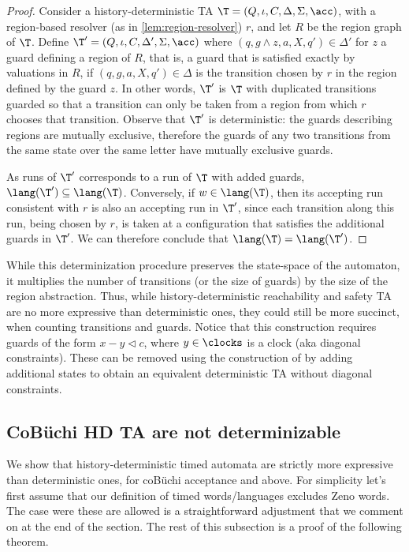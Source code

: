\begin{proof}
Consider a history-deterministic TA $\T=(Q,\iota,C,\Delta,\Sigma, \acc)$, with a region-based resolver (as in \cref{lem:region-resolver}) $r$, and let $R$ be the region graph of $\T$. Define $\T'=(Q,\iota,C,\Delta',\Sigma, \acc)$ where $(q,g\wedge z,a,X,q')\in \Delta'$  for $z$ a guard defining a region of $R$, that is, a guard that is satisfied exactly by valuations in $R$, if $(q,g,a,X,q')\in \Delta$ is the transition chosen by $r$ in the region defined by the guard $z$.
 In other words, $\T'$ is $\T$ with duplicated transitions guarded so that a transition can only be taken from a region from which $r$ chooses that transition. 
 Observe that $\T'$ is deterministic: the guards describing regions are mutually exclusive,  therefore the guards of any two transitions from the same state over the same letter have mutually exclusive guards.

As runs of $\T'$ corresponds to a run of $\T$ with added guards, $\lang(\T')\subseteq \lang(\T)$. Conversely, if $w\in \lang(\T)$, then its accepting run consistent with $r$ is also an accepting run in $\T'$, since each transition along this run, being chosen by $r$, is taken at a configuration that satisfies the additional guards in $\T'$. We can therefore conclude that $\lang(\T)=\lang(\T')$.
\end{proof}


While this determinization procedure preserves the state-space of the automaton, %
it multiplies the number of transitions (or the size of guards) by the size of the region abstraction. Thus, while history-deterministic reachability and safety TA are no more expressive than deterministic ones, they could still be more succinct, 
when counting transitions and guards.
Notice that this construction requires guards of the form $x-y\triangleleft c$, where $y\in\clocks$ is a clock (aka diagonal constraints). 
These can be removed using the construction of \cite{BPDG98} by adding additional states to obtain an equivalent deterministic TA without diagonal constraints.


\subsection{CoB\"uchi HD TA are not determinizable}
\label{sec:expressivity:d-hd}
We show that history-deterministic timed automata are strictly more expressive than deterministic ones, for coB\"uchi acceptance and above.
For simplicity let's first assume that our definition of timed words/languages excludes Zeno words.
The case were these are allowed is a straightforward adjustment that we comment on at the end of the section.
The rest of this subsection is a proof of the following theorem.

